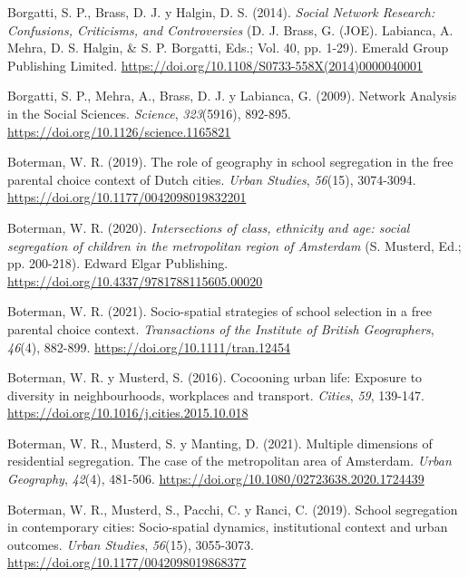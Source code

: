 \documentclass[
  spanish,
  a4paper,%
  chapterprefix=true,%
  DIV=calc,%
  twoside]{scrbook}%
\newlength{\cslhangindent}
\newenvironment{CSLReferences}[2] %
 {\begin{list}{}{%
  \setlength{\itemindent}{0pt}
  \setlength{\leftmargin}{0pt}
  \setlength{\parsep}{0pt}
  \ifodd #1
   \setlength{\leftmargin}{\cslhangindent}
   \setlength{\itemindent}{-1\cslhangindent}
  \fi
  \setlength{\itemsep}{#2\baselineskip}}}
 {\end{list}}
\begin{document}
\begin{CSLReferences}{1}{0}
Borgatti, S. P., Brass, D. J. y Halgin, D. S. (2014). \emph{Social Network Research: Confusions, Criticisms, and Controversies} (D. J. Brass, G. (JOE). Labianca, A. Mehra, D. S. Halgin, \& S. P. Borgatti, Eds.; Vol. 40, pp. 1-29). Emerald Group Publishing Limited. \url{https://doi.org/10.1108/S0733-558X(2014)0000040001}

Borgatti, S. P., Mehra, A., Brass, D. J. y Labianca, G. (2009). Network Analysis in the Social Sciences. \emph{Science}, \emph{323}(5916), 892-895. \url{https://doi.org/10.1126/science.1165821}

Boterman, W. R. (2019). The role of geography in school segregation in the free parental choice context of Dutch cities. \emph{Urban Studies}, \emph{56}(15), 3074-3094. \url{https://doi.org/10.1177/0042098019832201}

Boterman, W. R. (2020). \emph{Intersections of class, ethnicity and age: social segregation of children in the metropolitan region of Amsterdam} (S. Musterd, Ed.; pp. 200-218). Edward Elgar Publishing. \url{https://doi.org/10.4337/9781788115605.00020}

Boterman, W. R. (2021). Socio-spatial strategies of school selection in a free parental choice context. \emph{Transactions of the Institute of British Geographers}, \emph{46}(4), 882-899. \url{https://doi.org/10.1111/tran.12454}

Boterman, W. R. y Musterd, S. (2016). Cocooning urban life: Exposure to diversity in neighbourhoods, workplaces and transport. \emph{Cities}, \emph{59}, 139-147. \url{https://doi.org/10.1016/j.cities.2015.10.018}

Boterman, W. R., Musterd, S. y Manting, D. (2021). Multiple dimensions of residential segregation. The case of the metropolitan area of Amsterdam. \emph{Urban Geography}, \emph{42}(4), 481-506. \url{https://doi.org/10.1080/02723638.2020.1724439}

Boterman, W. R., Musterd, S., Pacchi, C. y Ranci, C. (2019). School segregation in contemporary cities: Socio-spatial dynamics, institutional context and urban outcomes. \emph{Urban Studies}, \emph{56}(15), 3055-3073. \url{https://doi.org/10.1177/0042098019868377}


\end{CSLReferences}
\end{document}

